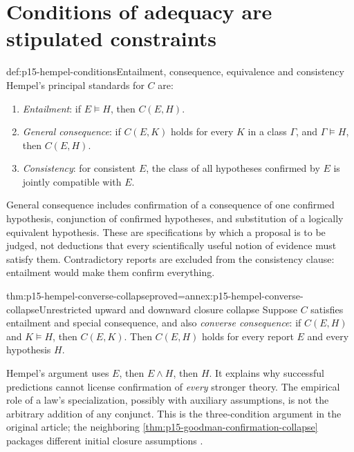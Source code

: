 \section{Conditions of adequacy are stipulated constraints}
\label{sec:p15-hempel-conditions}

\begin{hbdefinition}{def:p15-hempel-conditions}{Entailment, consequence, equivalence and consistency}
Hempel's principal standards for $C$ are:
\begin{enumerate}
\item \emph{Entailment}: if $E\models H$, then $C(E,H)$.
\item \emph{General consequence}: if $C(E,K)$ holds for every $K$ in a
      class $\Gamma$, and $\Gamma\models H$, then $C(E,H)$.
\item \emph{Consistency}: for consistent $E$, the class of all hypotheses
      confirmed by $E$ is jointly compatible with $E$.
\end{enumerate}
General consequence includes confirmation of a consequence of one confirmed
hypothesis, conjunction of confirmed hypotheses, and substitution of a
logically equivalent hypothesis. These are specifications by which a
proposal is to be judged, not deductions that every scientifically useful
notion of evidence must satisfy them. Contradictory reports are excluded
from the consistency clause: entailment would make them confirm everything.
\end{hbdefinition}

\begin{hbtheorem}{thm:p15-hempel-converse-collapse}{proved=annex:p15-hempel-converse-collapse}{Unrestricted upward and downward closure collapse}
Suppose $C$ satisfies entailment and special consequence, and also
\emph{converse consequence}: if $C(E,H)$ and $K\models H$, then $C(E,K)$.
Then $C(E,H)$ holds for every report $E$ and every hypothesis $H$.
\end{hbtheorem}

Hempel's argument uses $E$, then $E\land H$, then $H$. It explains why
successful predictions cannot license confirmation of \emph{every} stronger
theory. The empirical role of a law's specialization, possibly with auxiliary
assumptions, is not the arbitrary addition of any conjunct. This is the
three-condition argument in the original article; the neighboring
\cref{thm:p15-goodman-confirmation-collapse} packages different initial
closure assumptions
\parencite[II, \S8, pp.~102--105]{Hempel1945ConfirmationII}.

